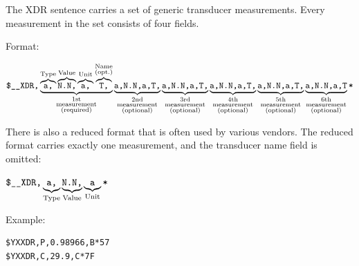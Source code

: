 \documentclass{zubaxdoc}
\begin{document}
The XDR sentence carries a set of generic transducer measurements.
Every measurement in the set consists of four fields.

Format:

$\texttt{\$\_\_XDR,}%
\underbrace{%
    \overbrace{\texttt{a,}}^{\text{Type}}%
    \overbrace{\texttt{N.N,}}^{\text{Value}}%
    \overbrace{\texttt{a,}}^{\text{Unit}}%
    \overbrace{\texttt{T,}}^{\substack{\text{Name} \\ \text{(opt.)}}}%
}_{\substack{\text{1st} \\ \text{measurement} \\ \text{(required)}}}%
\underbrace{\texttt{a,N.N,a,T,}}_{\substack{\text{2nd} \\ \text{measurement} \\ \text{(optional)}}}%
\underbrace{\texttt{a,N.N,a,T,}}_{\substack{\text{3rd} \\ \text{measurement} \\ \text{(optional)}}}%
\underbrace{\texttt{a,N.N,a,T,}}_{\substack{\text{4th} \\ \text{measurement} \\ \text{(optional)}}}%
\underbrace{\texttt{a,N.N,a,T,}}_{\substack{\text{5th} \\ \text{measurement} \\ \text{(optional)}}}%
\underbrace{\texttt{a,N.N,a,T}}_{\substack{\text{6th} \\ \text{measurement} \\ \text{(optional)}}}%
\texttt{\text{*}}$

There is also a reduced format that is often used by various vendors.
The reduced format carries exactly one measurement, and the transducer name field is omitted:

$\texttt{\$\_\_XDR,}%
\underbrace{\texttt{a,}}_{\text{Type}}%
\underbrace{\texttt{N.N,}}_{\text{Value}}%
\underbrace{\texttt{a}}_{\text{Unit}}%
\texttt{\text{*}}$

Example:
\begin{verbatim}
$YXXDR,P,0.98966,B*57
$YXXDR,C,29.9,C*7F
\end{verbatim}
\end{document}
